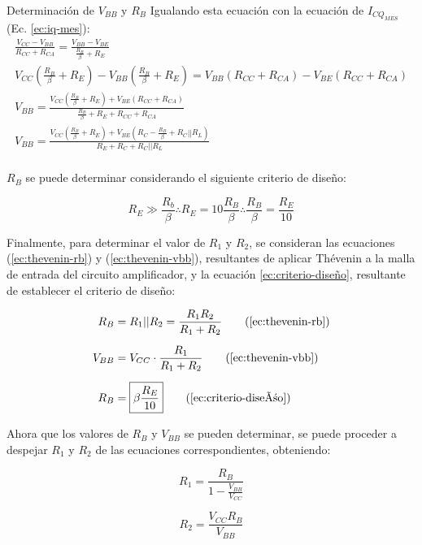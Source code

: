 \begin{frame}[allowframebreaks]{Determinación de $V_{BB}$ y $R_B$}
Igualando esta ecuación con la ecuación de $I_{CQ_{MES}}$ (Ec. \ref{ec:iq-mes}):
\small
\begin{gather}
    \frac{V_{CC}-V_{BB}}{R_{CC} + R_{CA}}= \frac{V_{BB}-V_{BE}}{\frac{R_B}{\beta}+R_E} \nonumber\\[6pt]
    V_{CC}\left(\frac{R_B}{\beta}+R_E\right) - V_{BB}\left(\frac{R_B}{\beta}+R_E\right) = V_{BB}\left(R_{CC}+R_{CA}\right) - V_{BE}\left(R_{CC}+R_{CA}\right) \nonumber\\[6pt]
    V_{BB} = \frac{V_{CC}\left(\frac{R_B}{\beta}+R_E\right) + V_{BE}\left(R_{CC}+R_{CA}\right)}{\frac{R_B}{\beta}+R_E + R_{CC} + R_{CA}} \nonumber\\[6pt]
    V_{BB} = \frac{V_{CC}\left(\frac{R_B}{\beta}+R_E\right) + V_{BE}\left(R_C-\frac{R_B}{\beta}+R_C||R_L\right)}{R_E + R_C + R_C||R_L} \label{ec:vbb}\\[6pt]
    \nonumber
\end{gather}

$R_B$ se puede determinar considerando el siguiente criterio de diseño:

\begin{equation}
    R_E  \gg \frac{R_b}{\beta} \therefore R_E = 10\frac{R_B}{\beta} \therefore \frac{R_B}{\beta} = \frac{R_E}{10} \label{ec:criterio-diseño}
\end{equation}

Finalmente, para determinar el valor de $R_1$ y $R_2$, se consideran las ecuaciones (\ref{ec:thevenin-rb}) y (\ref{ec:thevenin-vbb}), resultantes de aplicar Thévenin a la malla de entrada del circuito 
amplificador, y la ecuación \ref{ec:criterio-diseño},
resultante de establecer el criterio de diseño:

\begin{align*}
    R_B &= R_1||R_2=\frac{R_1 R_2}{R_1 + R_2} \tag{\ref{ec:thevenin-rb}}\\[6pt]
    V_{BB} &= V_{CC} \cdot \frac{R_1}{R_1 + R_2} \tag{\ref{ec:thevenin-vbb}}\\[6pt]
    R_B &= \boxed{\beta \frac{R_E}{10}} \tag{\ref{ec:criterio-diseño}}
\end{align*}

Ahora que los valores de $R_B$ y $V_{BB}$ se pueden determinar, se puede proceder a 
despejar $R_1$ y  $R_2$ de las ecuaciones correspondientes, obteniendo:

\begin{figure}[!ht]
    \centering
    \begin{minipage}[][\textheight][]{0.45\textwidth}
    \begin{equation}
        \boxed{R_1 = \frac{R_B}{1-\frac{V_{BB}}{V_{CC}}}}
        \label{eq:r1}
    \end{equation}
    \end{minipage}
    \begin{minipage}[][\textheight][]{0.45\textwidth}
    \begin{equation}
        \boxed{R_2 = \frac{V_{CC}R_B}{V_{BB}}}
        \label{eq:r2}
    \end{equation}
    \end{minipage}
\end{figure}
\end{frame}

